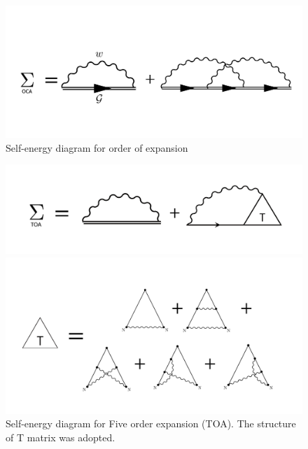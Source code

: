 \documentclass{article}[12pt]
\numberwithin{equation}{section}
\begin{document}
\begin{spacing}{1.5}
\begin{figure}[H]
  \centerline{\includegraphics[width=12cm]{TexFigure/OCA_self.PNG}}
  \caption{Self-energy diagram for order of expansion}
\end{figure}
\begin{figure}[H]
  \centerline{\includegraphics[width=12cm]{TexFigure/TOA_se.png}}
  \centerline{\includegraphics[width=12cm]{TexFigure/TOA_tmat.png}}
  \caption{Self-energy diagram for Five order expansion (TOA). The structure of T matrix was adopted.}
\end{figure}

\end{spacing}
\end{document}
